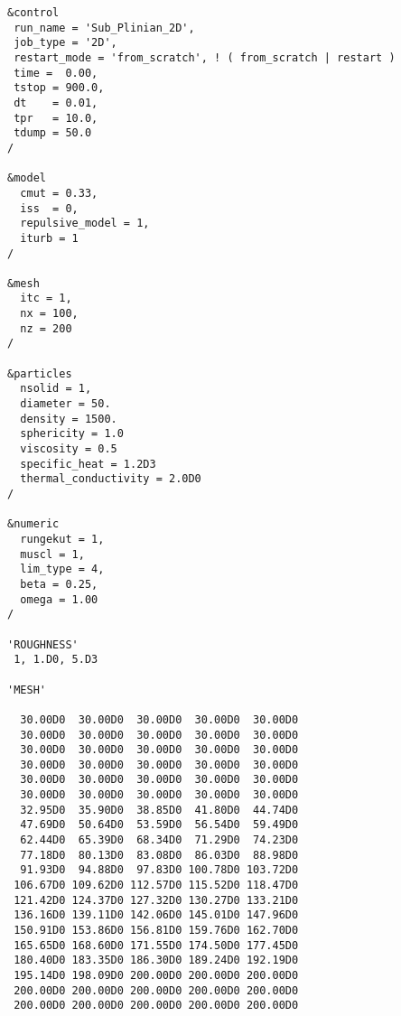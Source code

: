 \begin{verbatim}
&control
 run_name = 'Sub_Plinian_2D',
 job_type = '2D',
 restart_mode = 'from_scratch', ! ( from_scratch | restart )
 time =  0.00,
 tstop = 900.0,
 dt    = 0.01,
 tpr   = 10.0,
 tdump = 50.0
/

&model
  cmut = 0.33,
  iss  = 0,
  repulsive_model = 1,
  iturb = 1
/

&mesh
  itc = 1, 
  nx = 100,
  nz = 200
/

&particles
  nsolid = 1, 
  diameter = 50.
  density = 1500.
  sphericity = 1.0
  viscosity = 0.5
  specific_heat = 1.2D3
  thermal_conductivity = 2.0D0
/

&numeric
  rungekut = 1,
  muscl = 1,
  lim_type = 4,
  beta = 0.25,
  omega = 1.00
/

'ROUGHNESS'
 1, 1.D0, 5.D3

'MESH'

  30.00D0  30.00D0  30.00D0  30.00D0  30.00D0
  30.00D0  30.00D0  30.00D0  30.00D0  30.00D0
  30.00D0  30.00D0  30.00D0  30.00D0  30.00D0
  30.00D0  30.00D0  30.00D0  30.00D0  30.00D0
  30.00D0  30.00D0  30.00D0  30.00D0  30.00D0
  30.00D0  30.00D0  30.00D0  30.00D0  30.00D0
  32.95D0  35.90D0  38.85D0  41.80D0  44.74D0
  47.69D0  50.64D0  53.59D0  56.54D0  59.49D0
  62.44D0  65.39D0  68.34D0  71.29D0  74.23D0
  77.18D0  80.13D0  83.08D0  86.03D0  88.98D0
  91.93D0  94.88D0  97.83D0 100.78D0 103.72D0
 106.67D0 109.62D0 112.57D0 115.52D0 118.47D0
 121.42D0 124.37D0 127.32D0 130.27D0 133.21D0
 136.16D0 139.11D0 142.06D0 145.01D0 147.96D0
 150.91D0 153.86D0 156.81D0 159.76D0 162.70D0
 165.65D0 168.60D0 171.55D0 174.50D0 177.45D0
 180.40D0 183.35D0 186.30D0 189.24D0 192.19D0
 195.14D0 198.09D0 200.00D0 200.00D0 200.00D0
 200.00D0 200.00D0 200.00D0 200.00D0 200.00D0
 200.00D0 200.00D0 200.00D0 200.00D0 200.00D0


\end{verbatim}
